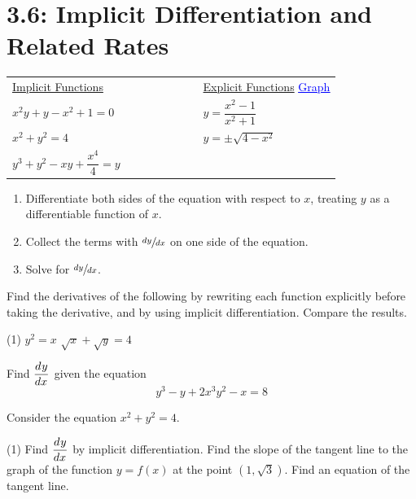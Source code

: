 \documentclass[../mathNotesPreamble]{subfiles}
\providecommand{\relscalefact}{1.4}
\begin{document}
\relscale{\relscalefact}
  \section{3.6: Implicit Differentiation and Related Rates}

  \begin{center}
    \renewcommand{\arraystretch}{2.5}
    \begin{tabular}{P{0.42\linewidth}m{0.2\linewidth/3}m{0.42\linewidth}}
      \underline{Implicit Functions} & & \underline{Explicit Functions} \hfill \href{https://www.desmos.com/calculator/gxlimjndt8}{\textcolor{blue}{\underline{Graph}}}\\
      $x^2y+y-x^2+1=0$&  & $y=\dfrac{x^2-1}{x^2+1}$\\
      $x^2+y^2=4$ & & $y=\pm\sqrt{4-x^2}$\\
      $y^3+y^2-xy+\dfrac{x^4}{4}=y$&
    \end{tabular}
  \end{center}
  \pagebreak

  \begin{thmBox*}
    \begin{enumerate}
      \item Differentiate both sides of the equation with respect to $x$, treating $y$ as a \newline differentiable function of $x$.
      \item Collect the terms with $\sfrac{dy}{dx}$ on one side of the equation.
      \item Solve for $\sfrac{dy}{dx}$.
    \end{enumerate}
  \end{thmBox*}
  \begin{ex*}
    Find the derivatives of the following by rewriting each function explicitly before taking the derivative, and by using implicit differentiation. Compare the results.
  \end{ex*}
  \begin{extasks}[after-item-skip=\stretch{1}](1)
    \task $y^2=x$
    \task $\sqrt x+\sqrt y=4$
  \end{extasks}
  \pagebreak

  \begin{ex*}
    Find $\displaystyle{\frac{d^{}y}{dx^{}}}$ given the equation
    \[y^3-y+2x^3y^2-x=8\]
  \end{ex*}
  \pagebreak

  \begin{ex*}
    Consider the equation $x^2+y^2=4$.
  \end{ex*}
  \begin{extasks}[after-item-skip=\stretch{1}](1)
    \task Find $\displaystyle{\frac{d^{}y}{dx^{}}}$ by implicit differentiation.
    \task Find the slope of the tangent line to the graph of the function $y=f(x)$ at the point $(1,\sqrt{3})$.
    \task Find an equation of the tangent line.
  \end{extasks}
  \pagebreak
\end{document}
